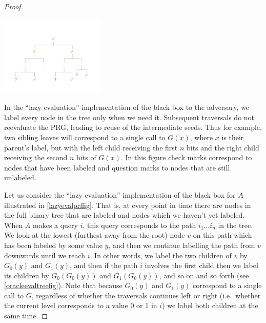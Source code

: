 \begin{proof}
\begin{marginfigure}
\centering
\includegraphics[width=\linewidth, height=1.5in, keepaspectratio]{../figure/Lazy_PRF_from_PRG.jpg}
\caption{In the ``lazy evaluation'' implementation of the black box to
the adversary, we label every node in the tree only when we need it.
Subsequent traversals do not reevaluate the PRG, leading to reuse of the
intermediate seeds. Thus for example, two sibling leaves will correspond
to a single call to \(G(x)\), where \(x\) is their parent's label, but
with the left child receiving the first \(n\) bits and the right child
receiving the second \(n\) bits of \(G(x)\). In this figure check marks
correspond to nodes that have been labeled and question marks to nodes
that are still unlabeled.}
\label{lazyevalprffig}
\end{marginfigure}

Let us consider the ``lazy evaluation'' implementation of the black box
for \(A\) illustrated in \cref{lazyevalprffig}. That is, at every point
in time there are nodes in the full binary tree that are labeled and
nodes which we haven't yet labeled. When \(A\) makes a query \(i\), this
query corresponds to the path \(i_1\ldots i_n\) in the tree. We look at
the lowest (furthest away from the root) node \(v\) on this path which
has been labeled by some value \(y\), and then we continue labelling the
path from \(v\) downwards until we reach \(i\). In other words, we label
the two children of \(v\) by \(G_0(y)\) and \(G_1(y)\), and then if the
path \(i\) involves the first child then we label its children by
\(G_0(G_0(y))\) and \(G_1(G_0(y))\), and so on and so forth (see
\cref{oracleevaltreefig}). Note that because \(G_{0}(y)\) and
\(G_{1}(y)\) correspond to a single call to \(G\), regardless of whether
the traversals continues left or right (i.e.~whether the current level
corresponds to a value 0 or 1 in \(i\)) we label both children at the
same time.



\end{proof}
